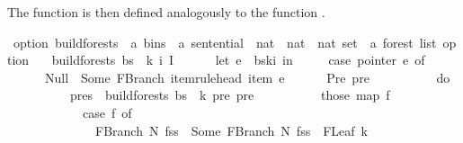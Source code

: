 \begin{isabellebody}
\begin{isamarkuptext}
The function  is then defined analogously to the function .%
\end{isamarkuptext}\isamarkuptrue%
\isamarkupfalse%
\ {\isacharparenleft}{\kern0pt}option{\isacharparenright}{\kern0pt}\ build{\isacharunderscore}{\kern0pt}forests{\isacharprime}{\kern0pt}\ {\isacharcolon}{\kern0pt}{\isacharcolon}{\kern0pt}\ {\isachardoublequoteopen}{\isacharprime}{\kern0pt}a\ bins\ {\isasymRightarrow}\ {\isacharprime}{\kern0pt}a\ sentential\ {\isasymRightarrow}\ nat\ {\isasymRightarrow}\ nat\ {\isasymRightarrow}\ nat\ set\ {\isasymRightarrow}\ {\isacharprime}{\kern0pt}a\ forest\ list\ option{\isachardoublequoteclose}\ \isanewline
\ \ {\isachardoublequoteopen}build{\isacharunderscore}{\kern0pt}forests{\isacharprime}{\kern0pt}\ bs\ {\isasymomega}\ k\ i\ I\ {\isacharequal}{\kern0pt}\ {\isacharparenleft}{\kern0pt}\isanewline
\ \ \ \ let\ e\ {\isacharequal}{\kern0pt}\ bs{\isacharbang}{\kern0pt}k{\isacharbang}{\kern0pt}i\ in\ {\isacharparenleft}{\kern0pt}\isanewline
\ \ \ \ case\ pointer\ e\ of\isanewline
\ \ \ \ \ \ Null\ {\isasymRightarrow}\ Some\ {\isacharparenleft}{\kern0pt}{\isacharbrackleft}{\kern0pt}FBranch\ {\isacharparenleft}{\kern0pt}item{\isacharunderscore}{\kern0pt}rule{\isacharunderscore}{\kern0pt}head\ {\isacharparenleft}{\kern0pt}item\ e{\isacharparenright}{\kern0pt}{\isacharparenright}{\kern0pt}\ {\isacharbrackleft}{\kern0pt}{\isacharbrackright}{\kern0pt}{\isacharbrackright}{\kern0pt}{\isacharparenright}{\kern0pt}\isanewline
\ \ \ \ {\isacharbar}{\kern0pt}\ Pre\ pre\ {\isasymRightarrow}\ {\isacharparenleft}{\kern0pt}\isanewline
\ \ \ \ \ \ \ \ do\ {\isacharbraceleft}{\kern0pt}\isanewline
\ \ \ \ \ \ \ \ \ \ pres\ {\isasymleftarrow}\ build{\isacharunderscore}{\kern0pt}forests{\isacharprime}{\kern0pt}\ bs\ {\isasymomega}\ {\isacharparenleft}{\kern0pt}k{\isacharminus}{\kern0pt}{}{\isacharparenright}{\kern0pt}\ pre\ {\isacharbraceleft}{\kern0pt}pre{\isacharbraceright}{\kern0pt}{\isacharsemicolon}{\kern0pt}\isanewline
\ \ \ \ \ \ \ \ \ \ those\ {\isacharparenleft}{\kern0pt}map\ {\isacharparenleft}{\kern0pt}{\isasymlambda}f{\isachardot}{\kern0pt}\isanewline
\ \ \ \ \ \ \ \ \ \ \ \ case\ f\ of\isanewline
\ \ \ \ \ \ \ \ \ \ \ \ \ \ FBranch\ N\ fss\ {\isasymRightarrow}\ Some\ {\isacharparenleft}{\kern0pt}FBranch\ N\ {\isacharparenleft}{\kern0pt}fss\ {\isacharat}{\kern0pt}\ {\isacharbrackleft}{\kern0pt}{\isacharbrackleft}{\kern0pt}FLeaf\ {\isacharparenleft}{\kern0pt}{\isasymomega}{\isacharbang}{\kern0pt}{\isacharparenleft}{\kern0pt}k{\isacharminus}{\kern0pt}{}{\isacharparenright}{\kern0pt}{\isacharparenright}{\kern0pt}{\isacharbrackright}{\kern0pt}{\isacharbrackright}{\kern0pt}{\isacharparenright}{\kern0pt}{\isacharparenright}{\kern0pt}\isanewline

\end{isabellebody}
